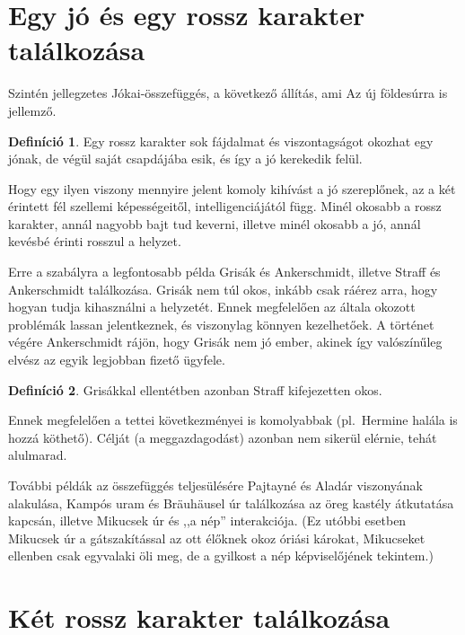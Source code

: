 \documentclass{thesis-ekf}
\theoremstyle{definition}
\newtheorem{definicio}{Definíció}[chapter]
\begin{document}
    \section{Egy jó és egy rossz karakter találkozása}\label{sec:egy-jo-es-egy-rossz-karakter-talalkozasa}

    Szintén jellegzetes Jókai-összefüggés, a következő állítás, ami Az új földesúrra is jellemző.
    \begin{definicio}\label{def:jo-rossz}
        Egy rossz karakter sok fájdalmat és viszontagságot okozhat egy jónak, de végül saját csapdájába esik, és így a jó kerekedik felül.
    \end{definicio}
    Hogy egy ilyen viszony mennyire jelent komoly kihívást a jó szereplőnek, az a két érintett fél szellemi képességeitől,
        intelligenciájától függ.
    Minél okosabb a rossz karakter, annál nagyobb bajt tud keverni, illetve minél okosabb a jó,
        annál kevésbé érinti rosszul a helyzet.

    Erre a szabályra a legfontosabb példa Grisák és Ankerschmidt, illetve Straff és Ankerschmidt találkozása.
        Grisák nem túl okos, inkább csak ráérez arra, hogy hogyan tudja kihasználni a helyzetét.
    Ennek megfelelően az általa okozott problémák lassan jelentkeznek, és viszonylag könnyen kezelhetőek.
    A történet végére Ankerschmidt rájön, hogy Grisák nem jó ember, akinek így valószínűleg elvész az egyik
        legjobban fizető ügyfele.
    \begin{definicio}\label{def:Straff-Grisak}
        Grisákkal ellentétben azonban Straff kifejezetten okos.
    \end{definicio}
    Ennek megfelelően a tettei következményei is komolyabbak
        (pl.~Hermine halála is hozzá köthető).
    Célját (a meggazdagodást) azonban nem sikerül elérnie, tehát alulmarad.

    További példák az összefüggés teljesülésére Pajtayné és Aladár viszonyának alakulása, Kampós uram és
        Bräuhäusel úr találkozása az öreg kastély átkutatása kapcsán, illetve Mikucsek úr és ,,a nép'' interakciója.
    (Ez utóbbi esetben Mikucsek úr a gátszakítással az ott élőknek okoz óriási károkat, Mikucseket ellenben csak
        egyvalaki öli meg, de a gyilkost a nép képviselőjének tekintem.)

    \section{Két rossz karakter találkozása}
\end{document}
